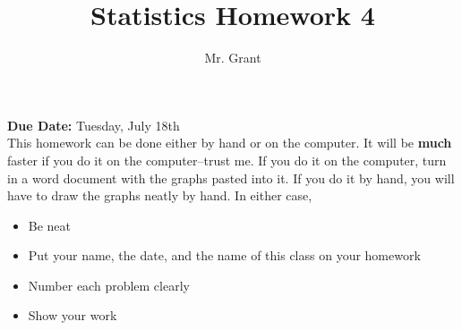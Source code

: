 \documentclass[12pt]{article}
\begin{document}
\title{Statistics Homework 4}
\author{Mr. Grant}
\maketitle

\textbf{Due Date:} Tuesday, July 18th \\

This homework can be done either by hand or on the computer. It will be \textbf{much} faster if you do it on the computer--trust me. If you do it on the computer, turn in a word document with the graphs pasted into it. If you do it by hand, you will have to draw the graphs neatly by hand. In either case,
\begin{itemize}
	\item Be neat
	\item Put your name, the date, and the name of this class on your homework 
	\item Number each problem clearly
	\item Show your work
\end{itemize}
\end{document}
